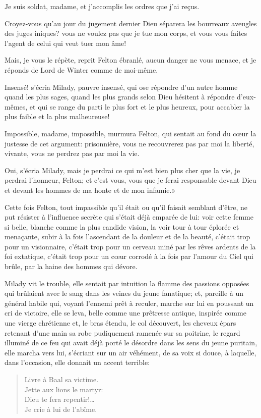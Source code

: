 \speak  Je suis soldat, madame, et j'accomplis les ordres que j'ai reçus. 

\speak  Croyez-vous qu'au jour du jugement dernier Dieu séparera les bourreaux aveugles des juges iniques? vous ne voulez pas que je tue mon corps, et vous vous faites l'agent de celui qui veut tuer mon âme! 

\speak  Mais, je vous le répète, reprit Felton ébranlé, aucun danger ne vous menace, et je réponds de Lord de Winter comme de moi-même. 

\speak  Insensé! s'écria Milady, pauvre insensé, qui ose répondre d'un autre homme quand les plus sages, quand les plus grands selon Dieu hésitent à répondre d'eux-mêmes, et qui se range du parti le plus fort et le plus heureux, pour accabler la plus faible et la plus malheureuse! 

\speak  Impossible, madame, impossible, murmura Felton, qui sentait au fond du cœur la justesse de cet argument: prisonnière, vous ne recouvrerez pas par moi la liberté, vivante, vous ne perdrez pas par moi la vie. 

\speak  Oui, s'écria Milady, mais je perdrai ce qui m'est bien plus cher que la vie, je perdrai l'honneur, Felton; et c'est vous, vous que je ferai responsable devant Dieu et devant les hommes de ma honte et de mon infamie.» 

Cette fois Felton, tout impassible qu'il était ou qu'il faisait semblant d'être, ne put résister à l'influence secrète qui s'était déjà emparée de lui: voir cette femme si belle, blanche comme la plus candide vision, la voir tour à tour éplorée et menaçante, subir à la fois l'ascendant de la douleur et de la beauté, c'était trop pour un visionnaire, c'était trop pour un cerveau miné par les rêves ardents de la foi extatique, c'était trop pour un cœur corrodé à la fois par l'amour du Ciel qui brûle, par la haine des hommes qui dévore. 

Milady vit le trouble, elle sentait par intuition la flamme des passions opposées qui brûlaient avec le sang dans les veines du jeune fanatique; et, pareille à un général habile qui, voyant l'ennemi prêt à reculer, marche sur lui en poussant un cri de victoire, elle se leva, belle comme une prêtresse antique, inspirée comme une vierge chrétienne et, le bras étendu, le col découvert, les cheveux épars retenant d'une main sa robe pudiquement ramenée sur sa poitrine, le regard illuminé de ce feu qui avait déjà porté le désordre dans les sens du jeune puritain, elle marcha vers lui, s'écriant sur un air véhément, de sa voix si douce, à laquelle, dans l'occasion, elle donnait un accent terrible: 
\begin{verse}
Livre à Baal sa victime.\\
Jette aux lions le martyr:\\
Dieu te fera repentir!\dots\\
Je crie à lui de l'abîme. 
\end{verse}

